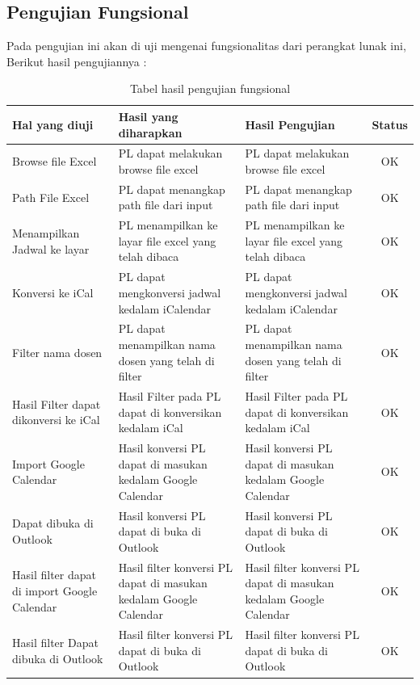 \subsection{Pengujian Fungsional}
Pada pengujian ini akan di uji mengenai fungsionalitas dari perangkat lunak ini, Berikut hasil pengujiannya : 
\begin{table}[H]
	\centering
		\caption{Tabel hasil pengujian fungsional}
		\label{tab:fungsional}
		\begin{tabular}{ | p{4cm} | p{4cm} | p{4cm} | c |}
			\hline
				Hal yang diuji & Hasil yang diharapkan & Hasil Pengujian & Status \\ \hline
				Browse file Excel & PL dapat melakukan browse file excel & PL dapat melakukan browse file excel & OK \\ \hline
				Path File Excel & PL dapat menangkap path file dari input & PL dapat menangkap path file dari input & OK \\ \hline
				Menampilkan Jadwal ke layar & PL menampilkan ke layar file excel yang telah dibaca  & PL menampilkan ke layar file excel yang telah dibaca & OK \\ \hline
				Konversi ke iCal & PL dapat mengkonversi jadwal kedalam iCalendar & PL dapat mengkonversi jadwal kedalam iCalendar & OK \\ \hline
				Filter nama dosen & PL dapat menampilkan nama dosen yang telah di filter & PL dapat menampilkan nama dosen yang telah di filter & OK \\ \hline
				Hasil Filter dapat dikonversi ke iCal & Hasil Filter pada PL dapat di konversikan kedalam iCal & Hasil Filter pada PL dapat di konversikan kedalam iCal & OK \\ \hline
				Import Google Calendar & Hasil konversi PL dapat di masukan kedalam Google Calendar & Hasil konversi PL dapat di masukan kedalam Google Calendar & OK \\ \hline
				Dapat dibuka di Outlook & Hasil konversi PL dapat di buka di Outlook & Hasil konversi PL dapat di buka di Outlook & OK \\ \hline
				Hasil filter dapat di import Google Calendar & Hasil filter konversi PL dapat di masukan kedalam Google Calendar & Hasil filter konversi PL dapat di masukan kedalam Google Calendar & OK \\ \hline
				Hasil filter Dapat dibuka di Outlook & Hasil filter konversi PL dapat di buka di Outlook & Hasil filter konversi PL dapat di buka di Outlook & OK \\ \hline
		\end{tabular}
\end{table}

